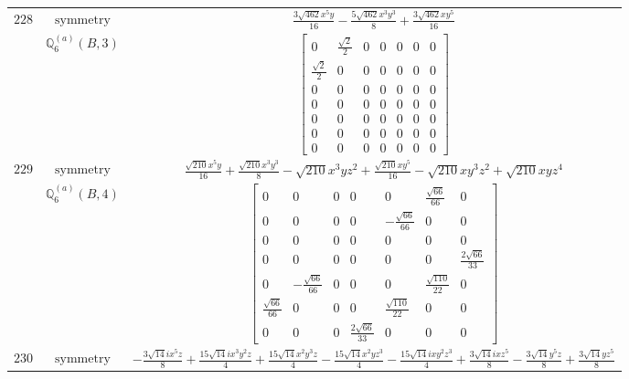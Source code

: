 \documentclass[fleqn,8pt,landscape]{jsarticle}
\begin{document}
\begin{longtable}{ccc}
$ 228 $ & $ \text{symmetry} $ & $ \frac{3 \sqrt{462} x^{5} y}{16} - \frac{5 \sqrt{462} x^{3} y^{3}}{8} + \frac{3 \sqrt{462} x y^{5}}{16} $ \\
$  $ & $ \mathbb{Q}_{6}^{(a)}(B,3) $ & $ \begin{bmatrix} 0 & \frac{\sqrt{2}}{2} & 0 & 0 & 0 & 0 & 0 \\ \frac{\sqrt{2}}{2} & 0 & 0 & 0 & 0 & 0 & 0 \\ 0 & 0 & 0 & 0 & 0 & 0 & 0 \\ 0 & 0 & 0 & 0 & 0 & 0 & 0 \\ 0 & 0 & 0 & 0 & 0 & 0 & 0 \\ 0 & 0 & 0 & 0 & 0 & 0 & 0 \\ 0 & 0 & 0 & 0 & 0 & 0 & 0 \end{bmatrix} $ \\ \hline
$ 229 $ & $ \text{symmetry} $ & $ \frac{\sqrt{210} x^{5} y}{16} + \frac{\sqrt{210} x^{3} y^{3}}{8} - \sqrt{210} x^{3} y z^{2} + \frac{\sqrt{210} x y^{5}}{16} - \sqrt{210} x y^{3} z^{2} + \sqrt{210} x y z^{4} $ \\
$  $ & $ \mathbb{Q}_{6}^{(a)}(B,4) $ & $ \begin{bmatrix} 0 & 0 & 0 & 0 & 0 & \frac{\sqrt{66}}{66} & 0 \\ 0 & 0 & 0 & 0 & - \frac{\sqrt{66}}{66} & 0 & 0 \\ 0 & 0 & 0 & 0 & 0 & 0 & 0 \\ 0 & 0 & 0 & 0 & 0 & 0 & \frac{2 \sqrt{66}}{33} \\ 0 & - \frac{\sqrt{66}}{66} & 0 & 0 & 0 & \frac{\sqrt{110}}{22} & 0 \\ \frac{\sqrt{66}}{66} & 0 & 0 & 0 & \frac{\sqrt{110}}{22} & 0 & 0 \\ 0 & 0 & 0 & \frac{2 \sqrt{66}}{33} & 0 & 0 & 0 \end{bmatrix} $ \\ \hline
$ 230 $ & $ \text{symmetry} $ & $ - \frac{3 \sqrt{14} i x^{5} z}{8} + \frac{15 \sqrt{14} i x^{3} y^{2} z}{4} + \frac{15 \sqrt{14} x^{2} y^{3} z}{4} - \frac{15 \sqrt{14} x^{2} y z^{3}}{4} - \frac{15 \sqrt{14} i x y^{2} z^{3}}{4} + \frac{3 \sqrt{14} i x z^{5}}{8} - \frac{3 \sqrt{14} y^{5} z}{8} + \frac{3 \sqrt{14} y z^{5}}{8} $ \\

\end{longtable}
\end{document}
